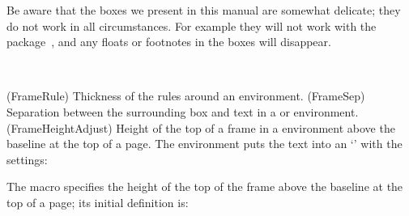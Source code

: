 
Be aware that the boxes we present in this manual are somewhat
delicate; they do not work in all circumstances. For example they will
not work with the  package~\cite{MULTICOL}, and any
floats or footnotes in the boxes will disappear.

\begin{syntax}
\lnc{\FrameRule} \lnc{\FrameSep} \lnc{\FrameHeightAdjust} \\
\end{syntax}
\glossary(FrameRule)%
  {}%
  {Thickness of the rules around an  environment.}
\glossary(FrameSep)%
  {}%
  {Separation between the surrounding box and text in a  or
    environment.}
\glossary(FrameHeightAdjust)%
  {}%
  {Height of the top of a frame in a  environment
  above the baseline at the top of a page.}
The  environment puts the text into an `\cmd{\fbox}' with
the settings:
\begin{lcode}
\setlength{\FrameRule}{\fboxrule}
\setlength{\FrameSep}{3\fboxsep}
\end{lcode}
The macro \cmd{\FrameHeightAdjust} specifies the height of the top of the frame
above the baseline at the top of a page; its initial definition is:
\begin{lcode}
\providecommand*{\FrameHeightAdjust}{0.6em}
\end{lcode}

